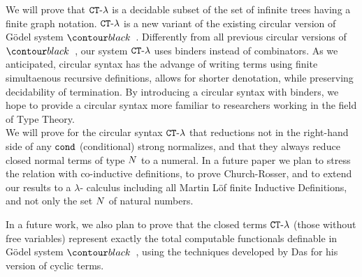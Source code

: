 %

We will prove that ${ {\tt CT}\mbox{-}\lambda}$ is a decidable subset of the set of infinite trees 
having a finite graph notation.
${ {\tt CT}\mbox{-}\lambda}$ is a new variant of the existing circular version of 
G\"{o}del system $\systemT$. Differently from all previous circular versions of 
$\systemT$, our system ${ {\tt CT}\mbox{-}\lambda}$ uses binders instead of combinators. 
As we anticipated, circular syntax has the advange of writing terms using
finite simultaenous recursive definitions, allows for shorter denotation, while preserving decidability of termination. By introducing a circular syntax with binders, 
we hope to provide a circular syntax more familiar to researchers working in the
field of Type Theory.
\\

We will prove for the circular syntax ${ {\tt CT}\mbox{-}\lambda}$
that reductions not in the right-hand side of any ${\tt cond}$ (conditional)
strong normalizes, and that they always reduce closed normal terms of type ${N}$ to a numeral. In a future paper we plan to stress the relation with co-inductive definitions, to prove Church-Rosser, and to extend our results to a $\lambda$-
calculus including all Martin L\"{o}f finite Inductive Definitions, and not only
the set ${N}$ of natural numbers.


In a future work, we also plan to prove that the closed terms ${ {\tt CT}\mbox{-}\lambda}$ 
(those without free variables) represent exactly the total computable functionals 
definable in G\"{o}del system $\systemT$, using the techniques developed by 
Das for his version of cyclic terms.



